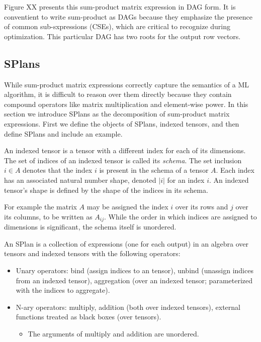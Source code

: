 Figure XX presents this sum-product matrix expression in DAG form.
It is conventient to write sum-product as DAGs because they emphasize the presence of common sub-sxpressions (CSEs), which are critical to recognize during optimization.  
This particular DAG has two roots for the output row vectors.




\subsection{SPlans}
While sum-product matrix expressions correctly capture the semantics of a ML algorithm, it is difficult to reason over them directly because they contain compound operators like matrix multiplication and element-wise power.  In this section we introduce SPlans as the decomposition of sum-product matrix expressions.  First we define the objects of SPlans, indexed tensors, and then define SPlans and include an example.

\begin{definition}
An indexed tensor is a tensor with a different index for each of its dimensions.
The set of indices of an indexed tensor is called its \emph{schema}.
The set inclusion $i \in A$ denotes that the index $i$ is present in the schema of a tensor $A$.
Each index has an associated natural number shape, denoted $|i|$ for an index $i$. 
An indexed tensor's shape is defined by the shape of the indices in its schema.
\end{definition}
For example the matrix $A$ may be assigned the index $i$ over its rows and $j$ over its columns, to be written as $A_{ij}$.
While the order in which indices are assigned to dimensions is significant, the schema itself is unordered.

\begin{definition}[SPlan]
An SPlan is a collection of expressions (one for each output) in an algebra over tensors and indexed tensors with the following operators:
\begin{itemize}
  \item Unary operators: bind (assign indices to an tensor), unbind (unassign indices from an indexed tensor), aggregation (over an indexed tensor; parameterized with the indices to aggregate).
  \item N-ary operators: multiply, addition (both over indexed tensors), external functions treated as black boxes (over tensors).
  \begin{itemize}
    \item The arguments of multiply and addition are unordered.
  \end{itemize}
\end{itemize}
\end{definition}


